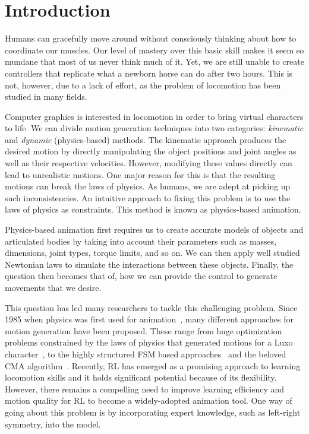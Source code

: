 
\chapter{Introduction}
\label{ch:Introduction}

Humans can gracefully move around without consciously thinking about how to coordinate our muscles. Our level of mastery over this basic skill makes it seem so mundane that most of us never think much of it.
Yet, we are still unable to create controllers that replicate what a newborn horse can do after two hours. This is not, however, due to a lack of effort, as the problem of locomotion has been studied in many fields.

Computer graphics is interested in locomotion in order to bring virtual characters to life. We can divide motion generation techniques into two categories: \textit{kinematic} and \textit{dynamic} (physics-based) methods.
The kinematic approach produces the desired motion by directly manipulating the object positions and joint angles as well as their respective velocities.
However, modifying these values directly can lead to unrealistic motions. One major reason for this is that the resulting motions can break the laws of physics. As humans, we are adept at picking up such inconsistencies.
An intuitive approach to fixing this problem is to use the laws of physics as constraints. This method is known as physics-based animation.


Physics-based animation first requires us to create accurate models of objects and articulated bodies by taking into account their parameters such as masses, dimensions, joint types, torque limits, and so on. We can then apply well studied Newtonian laws to simulate the interactions between these objects. Finally, the question then becomes that of, how we can provide the control to generate movements that we desire.

This question has led many researchers to tackle this challenging problem.
Since 1985 when physics was first used for animation~\cite{Armstrong1985}, many different approaches for motion generation have been proposed. These range from huge optimization problems constrained by the laws of physics that generated motions for a Luxo character~\cite{spacetime_constraints_luxo}, to the highly structured \acs{FSM} based approaches~\cite{Yin07} and the beloved CMA algorithm~\cite{Hansen06}. 
Recently, \ac{RL} has emerged as a promising approach to learning locomotion skills and it holds significant potential because of its flexibility.
However, there remains a compelling need to improve learning efficiency and motion quality for \ac{RL} to become a widely-adopted animation tool.
One way of going about this problem is by incorporating expert knowledge, such as left-right symmetry, into the model.

